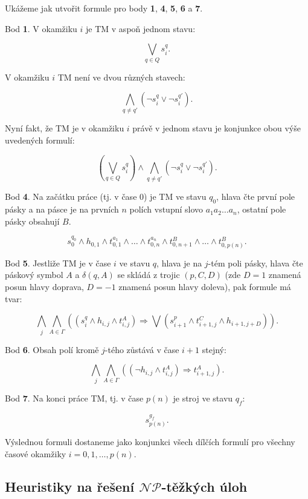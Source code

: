 \noindent Ukážeme jak utvořit formule pro body \textbf{1}, \textbf{4}, \textbf{5}, \textbf{6} a \textbf{7}.

Bod \textbf{1}. V okamžiku $i$ je TM v aspoň jednom stavu:

    $$\bigvee \limits_{q \in Q} s^{q}_{i}.$$
    
V okamžiku $i$ TM není ve dvou různých stavech:

    $$\bigwedge \limits_{q \neq q'} (\neg s^{q}_{i} \vee \neg s^{q'}_{i}).$$
    
Nyní fakt, že TM je v okamžiku $i$ právě v jednom stavu je konjunkce obou výše uvedených formulí:

    $$ (\bigvee \limits_{q \in Q} s^{q}_{i}) \wedge \bigwedge \limits_{q \neq q'} (\neg s^{q}_{i} \vee \neg s^{q'}_{i}).$$

Bod \textbf{4}. Na začátku práce (tj. v čase 0) je TM ve stavu $q_0$, hlava čte první pole pásky a na pásce je na prvních $n$ polích vstupní slovo $a_1 a_2\hdots a_n$, ostatní pole pásky obsahují $B$.

    $$s^{q_0}_{0} \wedge h_{0,1} \wedge t^{a_1}_{0,1} \wedge \hdots \wedge t^{a_n}_{0,n} \wedge t^{B}_{0,n + 1} \wedge \hdots \wedge t^{B}_{0,p(n)}.$$
    
Bod \textbf{5}. Jestliže TM je v čase $i$ ve stavu $q$, hlava je na $j$-tém poli pásky, hlava čte páskový symbol $A$ a $\delta (q, A)$ se skládá z trojic $(p, C, D)$ (zde $D = 1$ znamená posun hlavy doprava, $D = -1$ znamená posun hlavy doleva), pak formule má tvar:

    $$\bigwedge \limits_{j} \bigwedge \limits_{A \in \Gamma} ( (s^{q}_{i} \wedge h_{i,j} \wedge t^{A}_{i,j}) \Rightarrow \bigvee (s^{p}_{i+1} \wedge t^{C}_{i+1,j} \wedge h_{i+1,j+D}) ).$$
    
Bod \textbf{6}. Obsah polí kromě $j$-tého zůstává v čase $i + 1$ stejný:

    $$\bigwedge \limits_{j} \bigwedge \limits_{A \in \Gamma} ((\neg h_{i,j} \wedge t^{A}_{i,j}) \Rightarrow t^{A}_{i+1,j}).$$
    
Bod \textbf{7}. Na konci práce TM, tj. v čase $p(n)$ je stroj ve stavu $q_f$:

    $$s^{g_f}_{p(n)}.$$
    
Výslednou formuli dostaneme jako konjunkci všech dílčích formulí pro všechny časové okamžiky $i = 0, 1, \hdots , p(n)$.

\subsection{Heuristiky na řešení $\mathcal{NP}$-těžkých úloh}

